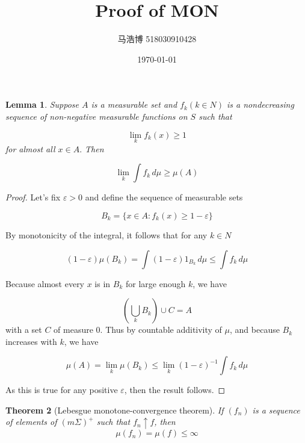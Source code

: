 \documentclass[12pt]{article}
\title{Proof of MON}
\author{马浩博 518030910428}
\date{\today}
\theoremstyle{mythm}
\newtheorem{theorem}{Theorem}
\newtheorem{lemma}[theorem]{Lemma}
\begin{document}
\maketitle

  \begin{lemma}
	Suppose $A$ is a measurable set and $f_k(k\in N)$ is a nondecreasing sequence of non-negative measurable functions on $S$ such that
	
	$$\lim _{k}f_{k}(x)\geq 1$$
	for almost all $x \in A.$ Then
	
	$$\lim _{k}\int f_{k}\,d\mu \geq \mu (A)$$
  \end{lemma}
\begin{proof}
	Let's fix $\varepsilon > 0$ and define the sequence of measurable sets
	
	$$B_{k}=\{x\in A:f_{k}(x)\geq 1-\varepsilon \}$$
	
	By monotonicity of the integral, it follows that for any $k \in N$
	
	$$(1-\varepsilon )\mu (B_{k})=\int (1-\varepsilon )1_{B_{k}}\,d\mu \leq \int f_{k}\,d\mu$$
	
	Because almost every $x$ is in $B_k$ for large enough $k$, we have
	
	$$(\bigcup _{k}B_k) \cup C=A$$
	with a set $C$ of measure 0. Thus by countable additivity of $\mu$, and because $B_k$ increases with $k$, we have
	
	$$\mu (A)=\lim _{k}\mu (B_{k})\leq \lim _{k}(1-\varepsilon )^{-1}\int f_{k}\,d\mu$$
	
	As this is true for any positive $\varepsilon$, then the result follows.
	
\end{proof}

  \begin{theorem}[Lebesgue monotone-convergence theorem]
  If $(f_n)$ is a sequence of elements of $(m\Sigma)^+$ such that $f_n \uparrow f$,
  then
  $$\mu(f_n)=\mu(f) \leq \infty$$
  \end{theorem}
    
\end{document}
